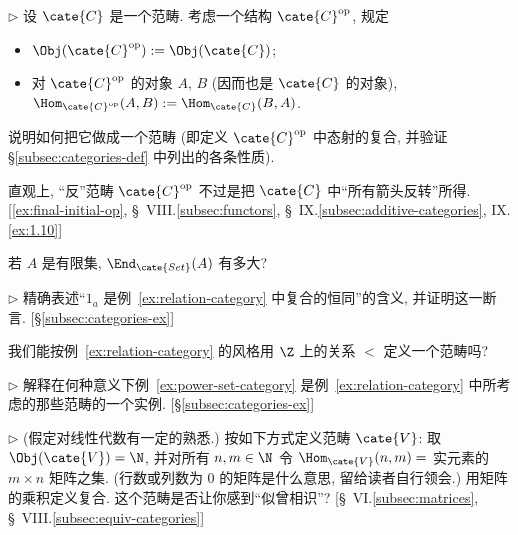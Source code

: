 \begin{prob}
\label{ex:opposite-category}
$\triangleright$ 设 $\cate{C}$ 是一个范畴. 考虑一个结构 $\cate{C}\op$, 规定
\begin{itemize}
	\item $\Obj(\cate{C}\op) := \Obj(\cate{C})$;
	\item 对 $\cate{C}\op$ 的对象 $A$, $B$ (因而也是 $\cate{C}$ 的对象), $\Hom_{\cate{C}\op}(A, B) := \Hom_{\cate{C}}(B, A)$.
\end{itemize}
说明如何把它做成一个范畴 (即定义 $\cate{C}\op$ 中态射的复合, 并验证 \S\ref{subsec:categories-def} 中列出的各条性质).

直观上, ``反''范畴%
$\cate{C}\op$ 不过是把 $\cate{C}$ 中``所有箭头反转''所得. [\ref{ex:final-initial-op}, \S~VIII.\ref{subsec:functors}, \S~IX.\ref{subsec:additive-categories}, IX.\ref{ex:1.10}]
\end{prob}

\begin{prob}
\label{ex:end-finite}
若 $A$ 是有限集, $\End_{\cate{Set}}(A)$ 有多大?
\end{prob}

\begin{prob}
\label{ex:identity-relation-category}
$\triangleright$ 精确表述``$1_a$ 是例~\ref{ex:relation-category} 中复合的恒同''的含义, 并证明这一断言. [\S\ref{subsec:categories-ex}]
\end{prob}

\begin{prob}
\label{ex:lt-category}
我们能按例~\ref{ex:relation-category} 的风格用 $\Z$ 上的关系 $<$ 定义一个范畴吗?
\end{prob}

\begin{prob}
\label{ex:power-set-as-relation}
$\triangleright$ 解释在何种意义下例~\ref{ex:power-set-category} 是例~\ref{ex:relation-category} 中所考虑的那些范畴的一个实例. [\S\ref{subsec:categories-ex}]
\end{prob}

\begin{prob}
\label{ex:matrix-category}
$\triangleright$ (假定对线性代数有一定的熟悉.) 按如下方式定义范畴 $\cate{V}$: 取 $\Obj(\cate{V}) = \N$, 并对所有 $n, m \in \N$ 令 $\Hom_{\cate{V}}(n, m) =$ 实元素的 $m \times n$ 矩阵之集. (行数或列数为 $0$ 的矩阵是什么意思, 留给读者自行领会.) 用矩阵的乘积定义复合. 这个范畴是否让你感到``似曾相识''? [\S~VI.\ref{subsec:matrices}, \S~VIII.\ref{subsec:equiv-categories}]
\end{prob}

